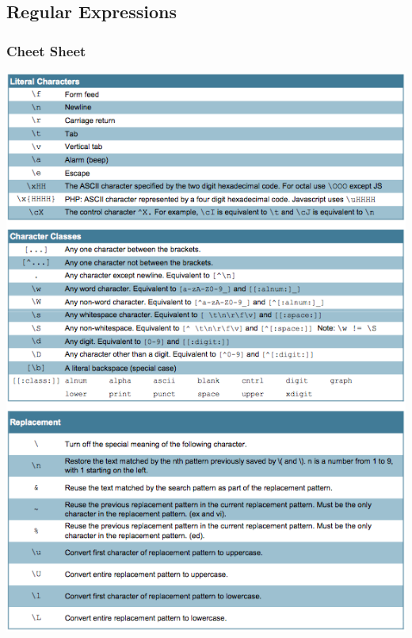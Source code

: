 \documentclass[10pt]{article}
\begin{document}
\subsection{Regular Expressions}
\subsubsection{Cheet Sheet}
\begin{center}
	\includegraphics[scale=0.75]{regex1.png}
\end{center}
\end{document}
